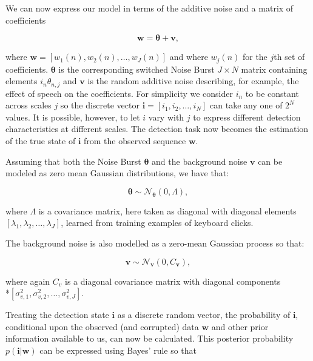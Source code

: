 We can now express our model in terms of the additive noise and a matrix of coefficients

\begin{equation}\label{eq:model2}
\boldsymbol{w} = \boldsymbol{\theta} + \boldsymbol{v},
\end{equation}

where $\boldsymbol{w} = [w_{1}(n),w_{2}(n),\ldots,w_{J}(n)]$ and where $w_{j}(n)$ for the $j$th set of coefficients. $\boldsymbol{\theta}$ is the corresponding switched Noise Burst $J \times N$ matrix containing elements $i_{n}\theta_{n,j}$ and $\boldsymbol{v}$ is the random additive noise describing, for example, the effect of speech on the coefficients. For simplicity we consider $i_{n}$ to be constant across scales $j$ so the discrete vector $\boldsymbol{i} = [i_{1}, i_{2}, \ldots, i_{N}]$ can take any one of $2^{N}$ values. It is possible, however, to let $i$ vary with $j$ to express different detection characteristics at different scales. The detection task now becomes the estimation of the true state of $\boldsymbol{i}$ from the observed sequence $\boldsymbol{w}$.

Assuming that both the Noise Burst $\boldsymbol{\theta}$ and the background noise $\boldsymbol{v}$ can be modeled as zero mean Gaussian distributions, we have that:

\begin{equation}\label{eq:burst}
\boldsymbol{\theta} \sim \mathcal{N}_{\boldsymbol{\theta}}(0,\Lambda),
\end{equation}

where $\Lambda$ is a covariance matrix, here taken as diagonal with diagonal elements $\left[\lambda_{1}, \lambda_{2}, \ldots, \lambda_{J}\right]$, learned from training examples of keyboard clicks.

The background noise is also modelled as a zero-mean Gaussian process so that:

\begin{equation}\label{eq:noise}
\boldsymbol{v} \sim \mathcal{N}_{\boldsymbol{v}}(0,C_{\boldsymbol{v}}),
\end{equation}

where again $C_v$ is a diagonal covariance matrix with diagonal components \\*$[\sigma_{v,1}^2, \sigma_{v,2}^2, \ldots, \sigma_{v,J}^2]$.

Treating the detection state $\boldsymbol{i}$ as a discrete random vector, the probability of $\boldsymbol{i}$, conditional upon the observed (and corrupted) data $\boldsymbol{w}$ and other prior information available to us, can now be calculated. This posterior probability $p(\boldsymbol{i}|\boldsymbol{w})$ can be expressed using Bayes' rule so that

